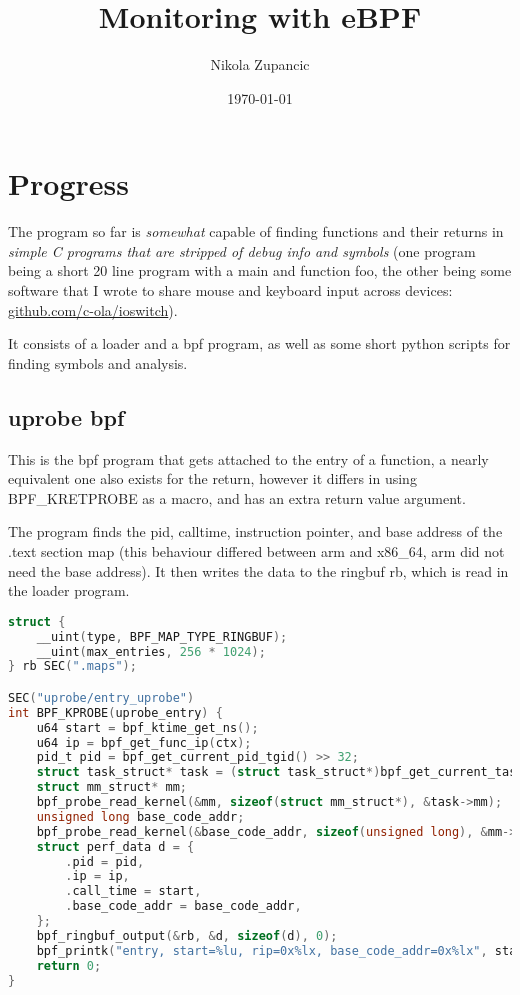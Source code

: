\documentclass[a4paper, 12pt, english]{article}
\title{Monitoring with eBPF}
\author{Nikola Zupancic}
\date{\today}
\begin{document}
\maketitle

\begin{center}
\end{center}

\vfill

\newpage
\section{Progress}
The program so far is \textit{somewhat} capable of finding functions and their returns in \textit{simple C programs that are stripped of debug info and symbols} (one program being a short 20 line program with a main and function foo, the other being some software that I wrote to share mouse and keyboard input across devices: \href{https://github.com/c-ola/ioswitch}{github.com/c-ola/ioswitch}).

It consists of a loader and a bpf program, as well as some short python scripts for finding symbols and analysis.

\subsection{uprobe bpf}

This is the bpf program that gets attached to the entry of a function, a nearly equivalent one also exists for the return, however it differs in using BPF\_KRETPROBE as a macro, and has an extra return value argument.

The program finds the pid, calltime, instruction pointer, and base address of the .text section map (this behaviour differed between arm and x86\_64, arm did not need the base address). It then writes the data to the ringbuf rb, which is read in the loader program.

\begin{lstlisting}[language=C, basicstyle=\ttfamily, frame=single]
struct {
    __uint(type, BPF_MAP_TYPE_RINGBUF);
    __uint(max_entries, 256 * 1024);
} rb SEC(".maps");

SEC("uprobe/entry_uprobe")
int BPF_KPROBE(uprobe_entry) {
    u64 start = bpf_ktime_get_ns();
    u64 ip = bpf_get_func_ip(ctx);
    pid_t pid = bpf_get_current_pid_tgid() >> 32;
    struct task_struct* task = (struct task_struct*)bpf_get_current_task();
    struct mm_struct* mm;
    bpf_probe_read_kernel(&mm, sizeof(struct mm_struct*), &task->mm);
    unsigned long base_code_addr;
    bpf_probe_read_kernel(&base_code_addr, sizeof(unsigned long), &mm->start_code);
    struct perf_data d = {
        .pid = pid,
        .ip = ip,
        .call_time = start,
        .base_code_addr = base_code_addr,
    };
    bpf_ringbuf_output(&rb, &d, sizeof(d), 0);
    bpf_printk("entry, start=%lu, rip=0x%lx, base_code_addr=0x%lx", start, ip, base_code_addr);
    return 0;
}
\end{lstlisting}
\end{document}
